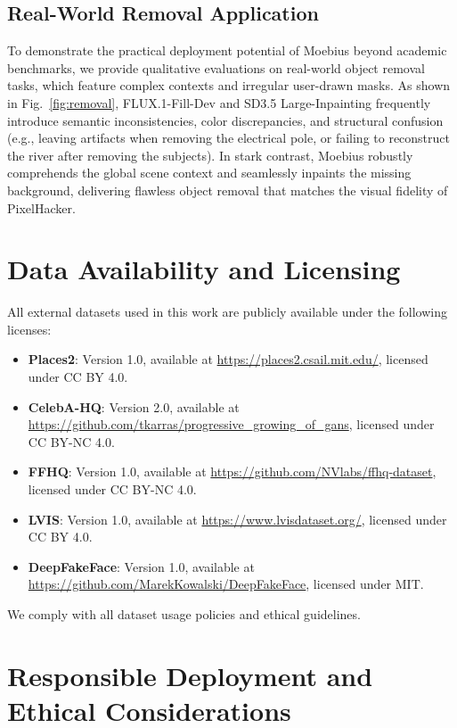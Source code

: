 \documentclass{llmxive}
\begin{document}
\subsection{Real-World Removal Application}\label{subsec:real_world}
To demonstrate the practical deployment potential of Moebius beyond academic benchmarks, we provide qualitative evaluations on real-world object removal tasks, which feature complex contexts and irregular user-drawn masks. As shown in Fig.~\ref{fig:removal}, FLUX.1-Fill-Dev and SD3.5 Large-Inpainting frequently introduce semantic inconsistencies, color discrepancies, and structural confusion (e.g., leaving artifacts when removing the electrical pole, or failing to reconstruct the river after removing the subjects). In stark contrast, Moebius robustly comprehends the global scene context and seamlessly inpaints the missing background, delivering flawless object removal that matches the visual fidelity of PixelHacker.

\vspace{-0.5em}
\section{Data Availability and Licensing}

All external datasets used in this work are publicly available under the following licenses:

\begin{itemize}
  \item \textbf{Places2}: Version 1.0, available at \url{https://places2.csail.mit.edu/}, licensed under CC BY 4.0.
  \item \textbf{CelebA-HQ}: Version 2.0, available at \url{https://github.com/tkarras/progressive_growing_of_gans}, licensed under CC BY-NC 4.0.
  \item \textbf{FFHQ}: Version 1.0, available at \url{https://github.com/NVlabs/ffhq-dataset}, licensed under CC BY-NC 4.0.
  \item \textbf{LVIS}: Version 1.0, available at \url{https://www.lvisdataset.org/}, licensed under CC BY 4.0.
  \item \textbf{DeepFakeFace}: Version 1.0, available at \url{https://github.com/MarekKowalski/DeepFakeFace}, licensed under MIT.
\end{itemize}

We comply with all dataset usage policies and ethical guidelines.


\section{Responsible Deployment and Ethical Considerations}
\end{document}

